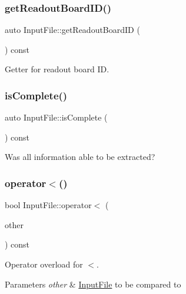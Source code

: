 \subsubsection{\texorpdfstring{get\+Readout\+Board\+I\+D()}{getReadoutBoardID()}}
{\footnotesize\ttfamily auto Input\+File\+::get\+Readout\+Board\+ID (\begin{DoxyParamCaption}{ }\end{DoxyParamCaption}) const\hspace{0.3cm}{\ttfamily [inline]}}



Getter for readout board ID. 

\mbox{\label{class_input_file_a65406d6a016391c2cccb0e6e4ee08099}} 
\subsubsection{\texorpdfstring{is\+Complete()}{isComplete()}}
{\footnotesize\ttfamily auto Input\+File\+::is\+Complete (\begin{DoxyParamCaption}{ }\end{DoxyParamCaption}) const\hspace{0.3cm}{\ttfamily [inline]}}



Was all information able to be extracted? 

\mbox{\label{class_input_file_a8c7c438538b8b183454632c27a55f701}} 
\subsubsection{\texorpdfstring{operator$<$()}{operator<()}}
{\footnotesize\ttfamily bool Input\+File\+::operator$<$ (\begin{DoxyParamCaption}\item[{const \hyperlink{class_input_file}{Input\+File} \&}]{other }\end{DoxyParamCaption}) const}



Operator overload for $<$. 


\begin{DoxyParams}{Parameters}
{\em other} & \hyperlink{class_input_file}{Input\+File} to be compared to \\
\hline
\end{DoxyParams}
\mbox{\label{class_input_file_aba80d895922ad25de1bdd7724d35755a}} 
